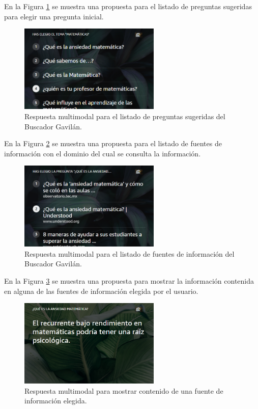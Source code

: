 En la Figura \ref{fig:53} se muestra una propuesta para el listado de preguntas sugeridas para elegir una pregunta inicial.

\begin{figure}[H]
  \centering
  \includegraphics[width=0.60\textwidth]{Cap5/Figuras/Multimodal2.png}
  \caption{Respuesta multimodal para el listado de preguntas sugeridas del Buscador Gavilán.}
  \label{fig:53}
\end{figure}

En la Figura \ref{fig:54} se muestra una propuesta para el listado de fuentes de información con el dominio del cual se consulta la información.

\begin{figure}[H]
  \centering
  \includegraphics[width=0.60\textwidth]{Cap5/Figuras/Multimodal3.png}
  \caption{Respuesta multimodal para el listado de fuentes de información del Buscador Gavilán.}
  \label{fig:54}
\end{figure}

En la Figura \ref{fig:55} se muestra una propuesta para mostrar la información contenida en alguna de las fuentes de información elegida por el usuario.

\begin{figure}[H]
  \centering
  \includegraphics[width=0.60\textwidth]{Cap5/Figuras/Multimodal4.png}
  \caption{Respuesta multimodal para mostrar contenido de una fuente de información elegida.}
  \label{fig:55}
\end{figure}

